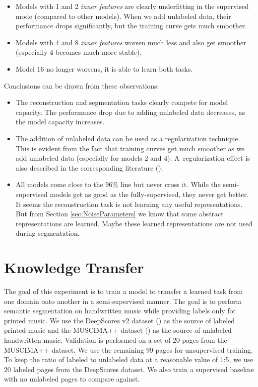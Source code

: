 \begin{itemize}
    \item Models with 1 and 2 \emph{inner features} are clearly underfitting in the supervised mode (compared to other models). When we add unlabeled data, their performance drops significantly, but the training curve gets much smoother.
    \item Models with 4 and 8 \emph{inner features} worsen much less and also get smoother (especially 4 becomes much more stable).
    \item Model 16 no longer worsens, it is able to learn both tasks.
\end{itemize}

Conclusions can be drawn from these observations:

\begin{itemize}
    \item The reconstruction and segmentation tasks clearly compete for model capacity. The performance drop due to adding unlabeled data decreases, as the model capacity increases.
    \item The addition of unlabeled data can be used as a regularization technique. This is evident from the fact that training curves get much smoother as we add unlabeled data (especially for models 2 and 4). A~regularization effect is also described in the corresponding literature (\cite{SemisupervisedOverview}).
    \item All models come close to the 96\% line but never cross it. While the semi-supervised models get as good as the fully-supervised, they never get better. It seems the reconstruction task is not learning any useful representations. But from Section \ref{sec:NoiseParameters} we know that some abstract representations are learned. Maybe these learned representations are not used during segmentation.
\end{itemize}


\section{Knowledge Transfer}
\label{sec:KnowledgeTransfer}

The goal of this experiment is to train a model to transfer a learned task from one domain onto another in a semi-supervised manner. The goal is to perform semantic segmentation on handwritten music while providing labels only for printed music. We use the DeepScores v2 dataset (\cite{DeepScores}) as the source of labeled printed music and the MUSCIMA++ dataset (\cite{MuscimaPP}) as the source of unlabeled handwritten music. Validation is performed on a set of 20 pages from the MUSCIMA++ dataset. We use the remaining 99 pages for unsupervised training. To keep the ratio of labeled to unlabeled data at a reasonable value of 1:5, we use 20 labeled pages from the DeepScores dataset. We also train a supervised baseline with no unlabeled pages to compare against.

